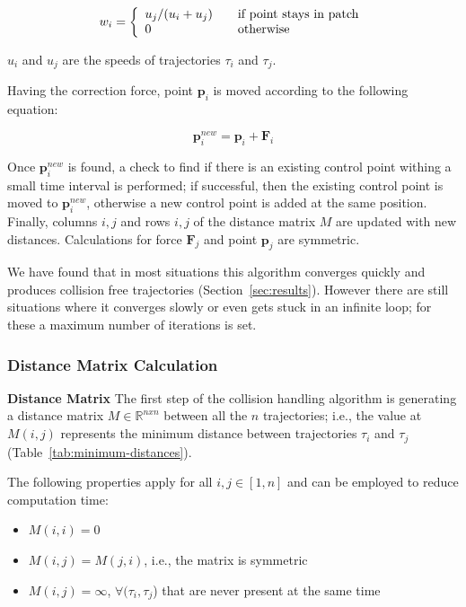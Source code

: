 \begin{equation}
w_i = \left\{
	\begin{array}{l l}
		u_j / (u_i + u_j)	&	\quad \text{if point stays in patch}\\
		0					&	\quad \text{otherwise}
	\end{array}
	\right.
\end{equation}

$u_i$ and $u_j$ are the speeds of trajectories $\tau_i$ and $\tau_j$.

Having the correction force, point $\mathbf{p}_i$ is moved according to the following equation:

\begin{equation}
	\mathbf{p}_i^{new} = \mathbf{p}_i + \mathbf{F}_i
\end{equation}


Once $\mathbf{p}_i^{new}$ is found, a check to find if there is an existing control point withing a small time interval is performed; if successful, then the existing control point is moved to $\mathbf{p}_i^{new}$, otherwise a new control point is added at the same position.
Finally, columns $i, j$ and rows $i, j$ of the distance matrix $M$ are updated with new distances.
Calculations for force $\mathbf{F}_j$ and point $\mathbf{p}_j$ are symmetric.

We have found that in most situations this algorithm converges quickly and produces collision free trajectories (Section~\ref{sec:results}).
However there are still situations where it converges slowly or even gets stuck in an infinite loop; for these a maximum number of iterations is set.


\subsubsection{Distance Matrix Calculation}
\label{sec:method:remove-collisions:distance-matrix}
\textbf{Distance Matrix} The first step of the collision handling algorithm is generating a distance matrix $M \in \mathbb{R}^{nxn}$ between all the $n$ trajectories; i.e., the value at $M(i, j)$ represents the minimum distance between trajectories $\tau_i$ and $\tau_j$ (Table~{\ref{tab:minimum-distances}}).

The following properties apply for all $i, j \in [1, n]$ and can be employed to reduce computation time:
\begin{itemize}
  \item $M(i, i) = 0$
  \item $M(i, j) = M(j, i)$, i.e., the matrix is symmetric
  \item $M(i, j) = \infty$, \hspace{0.1cm}$\forall (\tau_i, \tau_j$) that are never present at the same time
\end{itemize}

